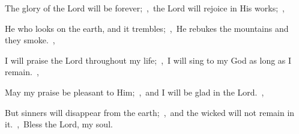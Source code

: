 \documentclass[12pt,twoside,a5paper]{article}
\begin{document}
\begin{normalparskip}
  The glory of the Lord will be forever;~\sep\ the Lord will rejoice in His works;~\sep

  He who looks on the earth, and it trembles;~\sep\ He rebukes the mountains and they smoke.~\sep

  I will praise the Lord throughout my life;~\sep\ I will sing to my God as long as I remain.~\sep

  May my praise be pleasant to Him;~\sep\ and I will be glad in the Lord.~\sep

  But sinners will disappear from the earth;~\sep\ and the wicked will not remain in it.~\sep\ Bless the Lord, my soul.
\end{normalparskip}



\end{document}
